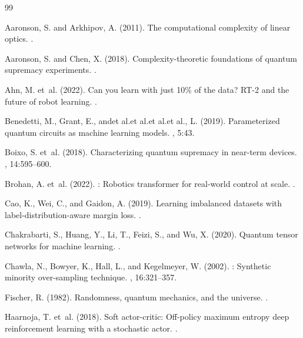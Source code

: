 \documentclass[10pt]{article}
\begin{document}
\begin{thebibliography}{99}


Aaronson, S. and Arkhipov, A. (2011).
\newblock The computational complexity of linear optics.
.

Aaronson, S. and Chen, X. (2018).
\newblock Complexity-theoretic foundations of quantum supremacy experiments.
.

Ahn, M. et~al. (2022).
\newblock Can you learn with just 10\% of the data? {RT-2} and the future of
  robot learning.
.

Benedetti, M., Grant, E., andet al.et al.et al.et al., L. (2019).
\newblock Parameterized quantum circuits as machine learning models.
, 5:43.

Boixo, S. et~al. (2018).
\newblock Characterizing quantum supremacy in near-term devices.
, 14:595--600.

Brohan, A. et~al. (2022).
: Robotics transformer for real-world control at scale.
.

Cao, K., Wei, C., and Gaidon, A. (2019).
\newblock Learning imbalanced datasets with label-distribution-aware margin
  loss.
.

Chakrabarti, S., Huang, Y., Li, T., Feizi, S., and Wu, X. (2020).
\newblock Quantum tensor networks for machine learning.
.

Chawla, N., Bowyer, K., Hall, L., and Kegelmeyer, W. (2002).
: Synthetic minority over-sampling technique.
, 16:321--357.

Fischer, R. (1982).
\newblock Randomness, quantum mechanics, and the universe.
.

Haarnoja, T. et~al. (2018).
\newblock Soft actor-critic: Off-policy maximum entropy deep reinforcement
  learning with a stochastic actor.
.


\end{thebibliography}
\end{document}
